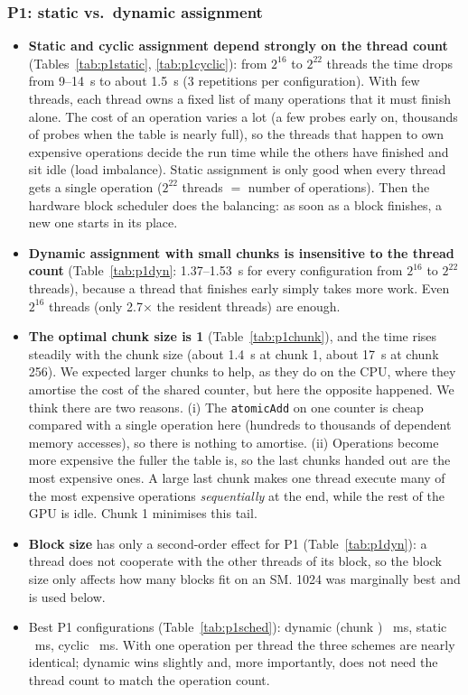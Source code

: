 \subsubsection*{P1: static vs.\ dynamic assignment}

\begin{itemize}
\item \textbf{Static and cyclic assignment depend strongly on the thread count}
  (Tables~\ref{tab:p1static}, \ref{tab:p1cyclic}): from $2^{16}$ to $2^{22}$
  threads the time drops from 9--14~s to about 1.5~s (3 repetitions per configuration). With few threads, each thread
  owns a fixed list of many operations that it must finish alone. The cost of an
  operation varies a lot (a few probes early on, thousands of probes
  when the table is nearly full), so the threads that happen to own expensive
  operations decide the run time while the others have finished and sit idle (load
  imbalance). Static assignment is only good when every thread gets a single
  operation ($2^{22}$ threads $=$ number of operations). Then the hardware
  block scheduler does the balancing: as soon as a block finishes, a new one
  starts in its place.
\item \textbf{Dynamic assignment with small chunks is insensitive to the thread
  count} (Table~\ref{tab:p1dyn}: 1.37--1.53~s for every configuration from
  $2^{16}$ to $2^{22}$ threads), because a thread that finishes early simply takes
  more work. Even $2^{16}$ threads (only 2.7$\times$ the
  \devmaxresidentthreads{} resident threads) are enough.
\item \textbf{The optimal chunk size is 1} (Table~\ref{tab:p1chunk}), and the time
  rises steadily with the chunk size (about 1.4~s at chunk 1, about 17~s at chunk 256).
  We expected larger chunks to help, as they do on the CPU, where they amortise the
  cost of the shared counter, but here the opposite happened. We think there are two
  reasons. (i) The \texttt{atomicAdd} on one counter is
  cheap compared with a single operation here (hundreds to thousands of
  dependent memory accesses), so there is nothing to amortise. (ii) Operations become more expensive the
  fuller the table is, so the last chunks handed out are the most
  expensive ones. A large last chunk makes one thread execute many of the most expensive
  operations \emph{sequentially} at the end, while the rest of the GPU is idle. Chunk 1
  minimises this tail.
\item \textbf{Block size} has only a second-order effect for P1 (Table~\ref{tab:p1dyn}):
  a thread does not cooperate with the other threads of its block, so the block
  size only affects how many blocks fit on an SM. 1024 was marginally best and
  is used below.
\item Best P1 configurations (Table~\ref{tab:p1sched}): dynamic (chunk \ponechunk)
  \ponedynamicms~ms, static \ponestaticms~ms, cyclic \ponecyclicms~ms. With one operation per
  thread the three schemes are nearly identical; dynamic wins slightly and, more
  importantly, does not need the thread count to match the operation count.
\end{itemize}

